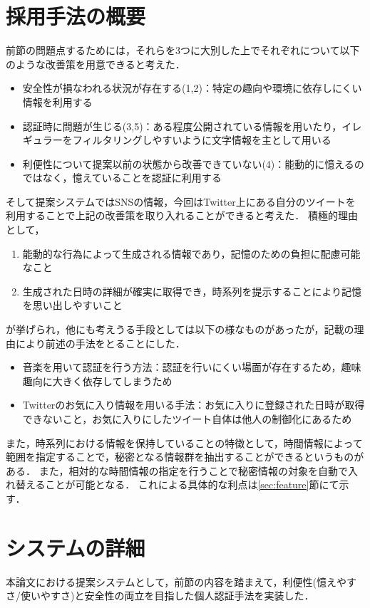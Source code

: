 \section{採用手法の概要}
前節の問題点するためには，それらを3つに大別した上でそれぞれについて以下のような改善策を用意できると考えた．
\begin{itemize}
\item 安全性が損なわれる状況が存在する(1,2)：特定の趣向や環境に依存しにくい情報を利用する
\item 認証時に問題が生じる(3,5)：ある程度公開されている情報を用いたり，イレギュラーをフィルタリングしやすいように文字情報を主として用いる
\item 利便性について提案以前の状態から改善できていない(4)：能動的に憶えるのではなく，憶えていることを認証に利用する
\end{itemize}
そして提案システムではSNSの情報，今回はTwitter上にある自分のツイートを利用することで上記の改善策を取り入れることができると考えた．
積極的理由として，
\begin{enumerate}
\item 能動的な行為によって生成される情報であり，記憶のための負担に配慮可能なこと
\item 生成された日時の詳細が確実に取得でき，時系列を提示することにより記憶を思い出しやすいこと
\end{enumerate}
が挙げられ，他にも考えうる手段としては以下の様なものがあったが，記載の理由により前述の手法をとることにした．
\begin{itemize}
\item 音楽を用いて認証を行う方法：認証を行いにくい場面が存在するため，趣味趣向に大きく依存してしまうため
\item Twitterのお気に入り情報を用いる手法：お気に入りに登録された日時が取得できないこと，お気に入りにしたツイート自体は他人の制御化にあるため
\end{itemize}

また，時系列における情報を保持していることの特徴として，時間情報によって範囲を指定することで，秘密となる情報群を抽出することができるというものがある．
また，相対的な時間情報の指定を行うことで秘密情報の対象を自動で入れ替えることが可能となる．
これによる具体的な利点は\ref{sec:feature}節にて示す．

\section{システムの詳細}
本論文における提案システムとして，前節の内容を踏まえて，利便性(憶えやすさ/使いやすさ)と安全性の両立を目指した個人認証手法を実装した．

